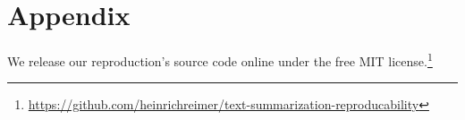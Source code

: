 \appendix
\section{Appendix} %

We release our reproduction's source code online under the free MIT license.\footnote{\url{https://github.com/heinrichreimer/text-summarization-reproducability}}
